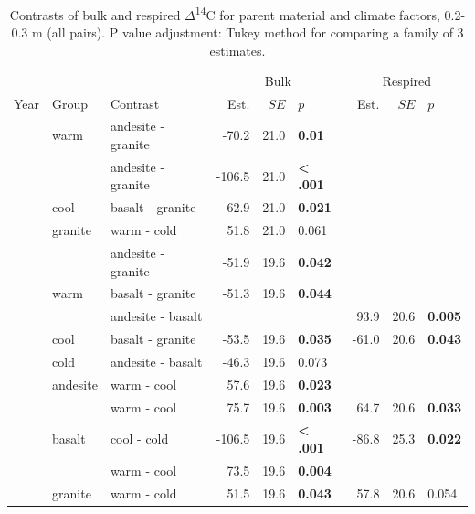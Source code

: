 \documentclass[english,man,floatsintext]{apa6}
\begin{document}
\begin{longtable}[t]{rllrrlrrl}
\caption{\label{tab:blk-inc-contrasts-30}Contrasts of bulk and respired \(\Delta\)\textsuperscript{14}C for parent material and climate factors, 0.2-0.3 m (all pairs). P value adjustment: Tukey method for comparing a family of 3 estimates.}\\
\toprule
\multicolumn{3}{c}{ } & \multicolumn{3}{c}{Bulk} & \multicolumn{3}{c}{Respired} \\
\cmidrule(l{3pt}r{3pt}){4-6} \cmidrule(l{3pt}r{3pt}){7-9}
Year & Group & Contrast & Est. & $SE$ & $p$ & Est. & $SE$ & $p$\\
\midrule
 & warm & andesite - granite & -70.2 & 21.0 & \textbf{0.01} &  &  & \\
\nopagebreak
 &  & andesite - granite & -106.5 & 21.0 & \textbf{< .001} &  &  & \\
\nopagebreak
 & \multirow[t]{-2}{*}{\raggedright\arraybackslash cool} & basalt - granite & -62.9 & 21.0 & \textbf{0.021} &  &  & \\
\nopagebreak
\multirow[t]{-4}{*}{\raggedleft\arraybackslash 2001} & granite & warm - cold & 51.8 & 21.0 & 0.061 &  &  & \\
\cmidrule{1-9}\pagebreak[0]
 &  & andesite - granite & -51.9 & 19.6 & \textbf{0.042} &  &  & \\
\nopagebreak
 & \multirow[t]{-2}{*}{\raggedright\arraybackslash warm} & basalt - granite & -51.3 & 19.6 & \textbf{0.044} &  &  & \\
\nopagebreak
 &  & andesite - basalt &  &  &  & 93.9 & 20.6 & \textbf{0.005}\\
\nopagebreak
 & \multirow[t]{-2}{*}{\raggedright\arraybackslash cool} & basalt - granite & -53.5 & 19.6 & \textbf{0.035} & -61.0 & 20.6 & \textbf{0.043}\\
\nopagebreak
 & cold & andesite - basalt & -46.3 & 19.6 & 0.073 &  &  & \\
\nopagebreak
 & andesite & warm - cool & 57.6 & 19.6 & \textbf{0.023} &  &  & \\
\nopagebreak
 &  & warm - cool & 75.7 & 19.6 & \textbf{0.003} & 64.7 & 20.6 & \textbf{0.033}\\
\nopagebreak
 & \multirow[t]{-2}{*}{\raggedright\arraybackslash basalt} & cool - cold & -106.5 & 19.6 & \textbf{< .001} & -86.8 & 25.3 & \textbf{0.022}\\
\nopagebreak
 &  & warm - cool & 73.5 & 19.6 & \textbf{0.004} &  &  & \\
\nopagebreak
\multirow[t]{-10}{*}{\raggedleft\arraybackslash 2019} & \multirow[t]{-2}{*}{\raggedright\arraybackslash granite} & warm - cold & 51.5 & 19.6 & \textbf{0.043} & 57.8 & 20.6 & 0.054\\
\bottomrule
\end{longtable}
\endgroup{}
\end{document}
